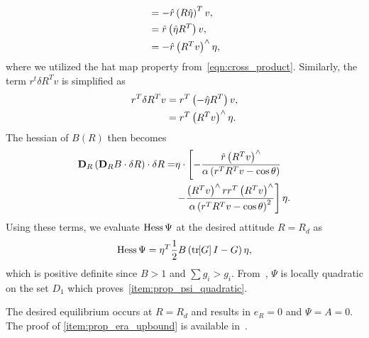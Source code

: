 \documentclass[10pt,fleqn]{IJCAS}  %
\begin{document}
\begin{multicols}{2}
\begin{align*}
    &= - \hat{r} \left( R \hat \eta \right)^T v , \\
    &= \hat{r} \left( \hat{\eta} R^T  \right) v , \\
    &= - \hat{r} \left( R^T v \right)^\wedge \eta ,
\end{align*}
where we utilized the hat map property from~\cref{eqn:cross_product}.
Similarly, the term \( r^t \delta R^T v \) is simplified as
\begin{align*}
    r^T \delta R^T v &= r^T \left( -\hat \eta R^T \right)v , \\
    &= r^T \left( R^T v \right)^\wedge \eta .
\end{align*}
The hessian of \( B(R) \) then becomes
\begin{align*}
    \mathbf{D}_{R} \left( \mathbf{D}_{R} B \cdot \delta R \right) \cdot \delta R =& \eta \cdot \left[ - \frac{ \hat r \left( R^T v \right)^\wedge}{\alpha \left( r^T R^T v - \cos \theta \right)} \right. \\ 
    & \left. - \frac{\left( R^T v \right)^\wedge r r^T \left( R^T v \right)^\wedge }{ \alpha\left( r^T R^T v - \cos \theta \right)^2}  \right] \eta .
\end{align*}
Using these terms, we evaluate \( \mathrm{Hess} \, \Psi \) at the desired attitude \( R = R_d \) as
\begin{align*}
    \mathrm{Hess} \, \Psi = \eta^T \frac{1}{2} B \left( \mathrm{tr}\negthickspace\left[ G \right]I -  G \right) \eta , 
\end{align*}
which is positive definite since \( B > 1\) and \( \sum g_i > g_i\). 
From~\cite[Proposition 6.30]{bullo2004}, \( \Psi \) is locally quadratic on the set \( D_1 \) which proves~\cref{item:prop_psi_quadratic}.

The desired equilibrium occurs at \( R=R_d\) and results in \( e_R = 0 \) and \( \Psi = A = 0\).
The proof of \cref{item:prop_era_upbound} is available in~\cite{LeeITCST13}.


\end{multicols}
\end{document}
